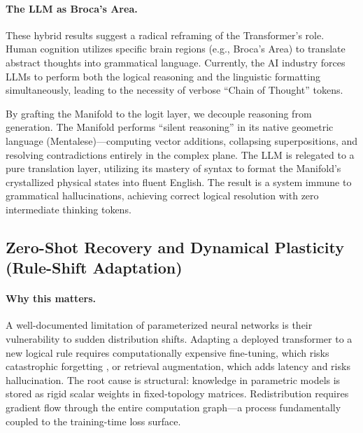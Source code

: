 \documentclass[11pt,a4paper]{article}
\begin{document}
\paragraph{The LLM as Broca's Area.}
These hybrid results suggest a radical reframing of the Transformer's role. Human cognition utilizes specific brain regions (e.g., Broca's Area) to translate abstract thoughts into grammatical language. Currently, the AI industry forces LLMs to perform both the logical reasoning and the linguistic formatting simultaneously, leading to the necessity of verbose ``Chain of Thought'' tokens. 

By grafting the Manifold to the logit layer, we decouple reasoning from generation. The Manifold performs ``silent reasoning'' in its native geometric language (Mentalese)---computing vector additions, collapsing superpositions, and resolving contradictions entirely in the complex plane. The LLM is relegated to a pure translation layer, utilizing its mastery of syntax to format the Manifold's crystallized physical states into fluent English. The result is a system immune to grammatical hallucinations, achieving correct logical resolution with zero intermediate thinking tokens.

\FloatBarrier


\subsection{Zero-Shot Recovery and Dynamical Plasticity (Rule-Shift Adaptation)}
\label{sec:rule_shift}

\paragraph{Why this matters.}
A well-documented limitation of parameterized neural networks is their vulnerability to sudden distribution shifts. Adapting a deployed transformer to a new logical rule requires computationally expensive fine-tuning, which risks catastrophic forgetting \citep{kirkpatrick2017overcoming}, or retrieval augmentation, which adds latency and risks hallucination. The root cause is structural: knowledge in parametric models is stored as rigid scalar weights in fixed-topology matrices. Redistribution requires gradient flow through the entire computation graph---a process fundamentally coupled to the training-time loss surface.
\end{document}
